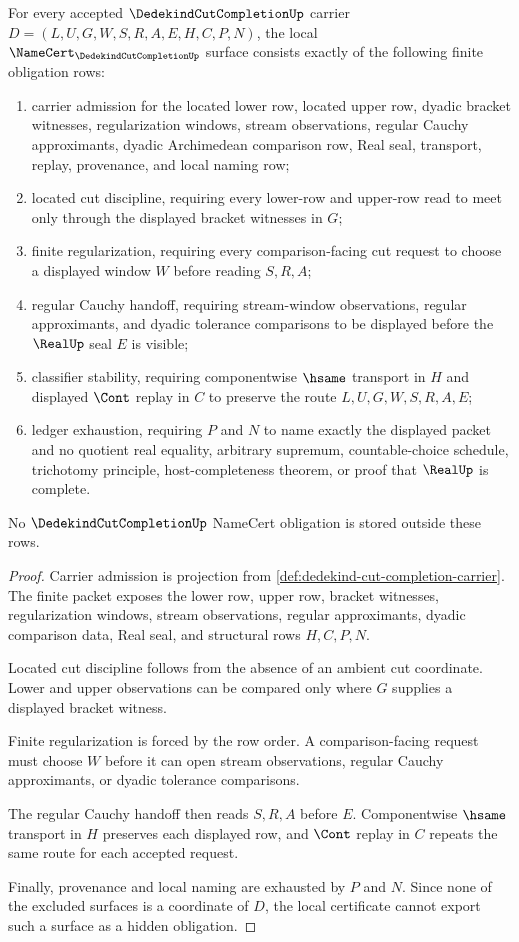 \begin{theorem}
\label{thm:dedekind-cut-completion-namecert-obligations}
For every accepted $\DedekindCutCompletionUp$ carrier $D=(L,U,G,W,S,R,A,E,H,C,P,N)$, the local $\NameCert_{\DedekindCutCompletionUp}$ surface consists exactly of the following finite obligation rows:
\begin{enumerate}
\item carrier admission for the located lower row, located upper row, dyadic bracket witnesses, regularization windows, stream observations, regular Cauchy approximants, dyadic Archimedean comparison row, Real seal, transport, replay, provenance, and local naming row;
\item located cut discipline, requiring every lower-row and upper-row read to meet only through the displayed bracket witnesses in $G$;
\item finite regularization, requiring every comparison-facing cut request to choose a displayed window $W$ before reading $S,R,A$;
\item regular Cauchy handoff, requiring stream-window observations, regular approximants, and dyadic tolerance comparisons to be displayed before the $\RealUp$ seal $E$ is visible;
\item classifier stability, requiring componentwise $\hsame$ transport in $H$ and displayed $\Cont$ replay in $C$ to preserve the route $L,U,G,W,S,R,A,E$;
\item ledger exhaustion, requiring $P$ and $N$ to name exactly the displayed packet and no quotient real equality, arbitrary supremum, countable-choice schedule, trichotomy principle, host-completeness theorem, or proof that $\RealUp$ is complete.
\end{enumerate}
No $\DedekindCutCompletionUp$ NameCert obligation is stored outside these rows.
\end{theorem}
\begin{proof}
Carrier admission is projection from \autoref{def:dedekind-cut-completion-carrier}. The finite packet exposes the lower row, upper row, bracket witnesses, regularization windows, stream observations, regular approximants, dyadic comparison data, Real seal, and structural rows $H,C,P,N$.

Located cut discipline follows from the absence of an ambient cut coordinate. Lower and upper observations can be compared only where $G$ supplies a displayed bracket witness.

Finite regularization is forced by the row order. A comparison-facing request must choose $W$ before it can open stream observations, regular Cauchy approximants, or dyadic tolerance comparisons.

The regular Cauchy handoff then reads $S,R,A$ before $E$. Componentwise $\hsame$ transport in $H$ preserves each displayed row, and $\Cont$ replay in $C$ repeats the same route for each accepted request.

Finally, provenance and local naming are exhausted by $P$ and $N$. Since none of the excluded surfaces is a coordinate of $D$, the local certificate cannot export such a surface as a hidden obligation.
\end{proof}

